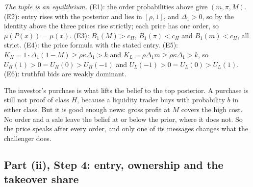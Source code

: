 \emph{The tuple is an equilibrium.} (E1): the order probabilities above give \((m,\pi,M)\). (E2): entry rises with
the posterior and lies in \([\rho,1]\), and \(\Delta_1>0\), so by the identity above the three prices rise strictly;
each price has one order, so \(\bar\mu(P(x))=\mu(x)\). (E3): \(B_1(M)>c_H\), \(B_1(\pi)<c_H\) and \(B_1(m)<c_H\), all
strict. (E4): the price formula with the stated entry. (E5): \(K_H=1\cdot\Delta_1(1-M)\ge\rho\kappa\Delta_1>k\) and
\(K_L=\rho\Delta_1m\ge\rho\kappa\Delta_1>k\), so \(U_H(1)>0=U_H(0)>U_H(-1)\) and \(U_L(-1)>0=U_L(0)>U_L(1)\). (E6):
truthful bids are weakly dominant.

\begin{intuition}
The investor's purchase is what lifts the belief to the top posterior. A purchase is still not proof of class
\(H\), because a liquidity trader buys with probability \(b\) in either class. But it is good enough news: gross
profit at \(M\) covers the high cost. No order and a sale leave the belief at or below the prior, where it does
not. So the price speaks after every order, and only one of its messages changes what the challenger does.
\end{intuition}

\subsection{Part (ii), Step 4: entry, ownership and the takeover share}


